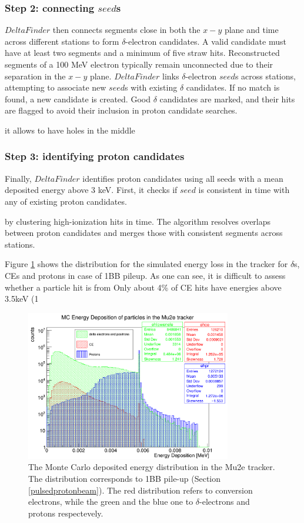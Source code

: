 \subsubsection{Step 2: connecting $seed$s}
$DeltaFinder$ then connects segments close in 
both the $x-y$ plane and 
time across different stations to form $\delta$-electron candidates. 
A valid candidate must have at least two segments and a 
minimum of five straw hits. 
Reconstructed segments of a 100 MeV electron typically 
remain unconnected 
due to their separation in the $x-y$ plane.
$DeltaFinder$ links $\delta$-electron $seed$s across 
stations, attempting to 
associate new $seed$s with existing $\delta$ 
candidates. If no match is found, a new candidate is created.
Good $\delta$ candidates are marked, and their hits are flagged 
to avoid their inclusion in proton candidate searches.


it allows to have holes in the middle
\subsubsection{Step 3: identifying proton candidates}
Finally, $DeltaFinder$ identifies proton candidates using 
all seeds with a mean deposited energy above 3 keV. 
First, it checks if $seed$ is consistent in time 
with any of existing proton candidates.

by 
clustering high-ionization 
hits in time. The algorithm resolves overlaps 
between proton candidates and 
merges those with consistent segments across stations.


Figure \ref{fig:energydeposited} shows the distribution for the simulated energy loss in the tracker for 
$\delta$s, CEs and protons in case of 1BB pileup. As one can see, it is difficult to 
assess whether a particle hit is from  Only about 4\% of CE hits have energies above 3.5keV (1%
\begin{figure}[!h]
    \centering
    \includegraphics[width =0.8\textwidth]{figures/png/Screenshot_20240729_151910.png}
\caption[Monte Carlo deposited energy distribution in the Mu2e tracker.]{
   The Monte Carlo deposited energy distribution in the Mu2e tracker. The distribution
   corresponds to 1BB pile-up (Section \ref{pulsedprotonbeam}). The red distribution refers to 
   conversion electrons, while the green and the blue one to $\delta$-electrons and protons respectevely.
}
   \label{fig:energydeposited}
\end{figure}

